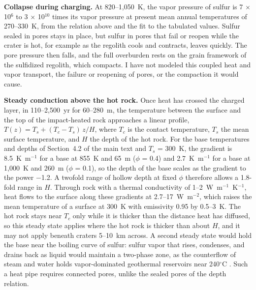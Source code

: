 \documentclass{planetary}
\begin{document}
\textbf{Collapse during charging.} At 820--1,050~K, the vapor pressure of sulfur is 7 $\times$ 10$^6$ to 3 $\times$ 10$^{10}$ times its vapor pressure at present mean annual temperatures of 270--330~K, from the relation above and the fit to the tabulated values. Sulfur sealed in pores stays in place, but sulfur in pores that fail or reopen while the crater is hot, for example as the regolith cools and contracts, leaves quickly. The pore pressure then falls, and the full overburden rests on the grain framework of the sulfidized regolith, which compacts. I have not modeled this coupled heat and vapor transport, the failure or reopening of pores, or the compaction it would cause.

\textbf{Steady conduction above the hot rock.} Once heat has crossed the charged layer, in 110--2,500~yr for 60--280~m, the temperature between the surface and the top of the impact-heated rock approaches a linear profile, $T(z) = T_s + (T_c - T_s)\, z/H$, where $T_c$ is the contact temperature, $T_s$ the mean surface temperature, and $H$ the depth of the hot rock. For the base temperatures and depths of Section~4.2 of the main text and $T_s$ = 300~K, the gradient is 8.5~K~m$^{-1}$ for a base at 855~K and 65~m ($\phi$ = 0.4) and 2.7~K~m$^{-1}$ for a base at 1,000~K and 260~m ($\phi$ = 0.1), so the depth of the base scales as the gradient to the power $-$1.2. A twofold range of hollow depth at fixed $\phi$ therefore allows a 1.8-fold range in $H$. Through rock with a thermal conductivity of 1--2~W~m$^{-1}$~K$^{-1}$, heat flows to the surface along these gradients at 2.7--17~W~m$^{-2}$, which raises the mean temperature of a surface at 300~K with emissivity 0.95 by 0.5--3~K. The hot rock stays near $T_c$ only while it is thicker than the distance heat has diffused, so this steady state applies where the hot rock is thicker than about $H$, and it may not apply beneath craters 5--10~km across. A second steady state would hold the base near the boiling curve of sulfur: sulfur vapor that rises, condenses, and drains back as liquid would maintain a two-phase zone, as the counterflow of steam and water holds vapor-dominated geothermal reservoirs near 240$^\circ$C \parencite{white1971}. Such a heat pipe requires connected pores, unlike the sealed pores of the depth relation.
\end{document}

